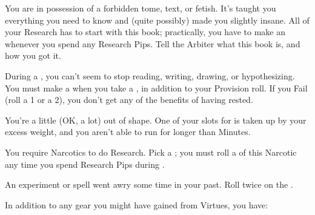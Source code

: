 \begin{multicols*}{2}
\cbreak


  You are in possession of a forbidden tome, text, or fetish. It's taught you everything you need to know and (quite possibly) made you slightly insane. All of your Research has to start with this book; practically, you have to make an  whenever you spend any Research Pips. Tell the Arbiter what this book is, and how you got it.


  During a , you can't seem to stop reading, writing, drawing, or hypothesizing. You must make a \RSTRY{\FOC} when you take a , in addition to your Provision roll. If you Fail (roll a 1 or a 2), you don't get any of the benefits of having rested.


  You're a little (OK, a lot) out of shape. One of your slots for  is taken up by your excess weight, and you aren't able to run for longer than Minutes.



  You require Narcotics to do Research. Pick a ; you must roll a \UD of this Narcotic any time you spend Research Pips during  .


  An experiment or spell went awry some time in your past. Roll twice on the .

\newpage


    In addition to any gear you might have gained from Virtues, you have:





\end{multicols*}
